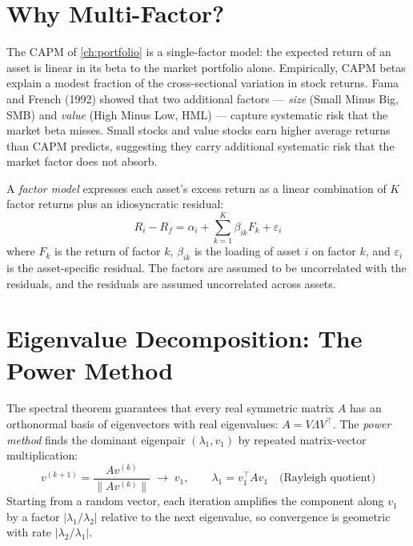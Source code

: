 \section{Why Multi-Factor?}


The CAPM of \cref{ch:portfolio} is a single-factor model: the expected
return of an asset is linear in its beta to the market portfolio alone.
Empirically, CAPM betas explain a modest fraction of the
cross-sectional variation in stock returns. Fama and French (1992)
showed that two additional factors --- \emph{size} (Small Minus Big,
SMB) and \emph{value} (High Minus Low, HML) --- capture systematic risk
that the market beta misses. Small stocks and value stocks earn higher
average returns than CAPM predicts, suggesting they carry additional
systematic risk that the market factor does not absorb.

\begin{marginfigure}
    \centering
    \vspace{-2cm}
    
    \caption{Scree plot: explained variance per principal component.
    The first PC captures 96\% of the total variance; the second adds
    3.9\%; the third adds only 0.3\%.}
    \label{fig:scree-plot}
\end{marginfigure}

A \emph{factor model} expresses each asset's excess return as a linear
combination of $K$ factor returns plus an idiosyncratic residual:
\[
  R_i - R_f = \alpha_i + \sum_{k=1}^{K} \beta_{ik} F_k + \varepsilon_i
\]
where $F_k$ is the return of factor $k$, $\beta_{ik}$ is the loading of
asset $i$ on factor $k$, and $\varepsilon_i$ is the asset-specific
residual. The factors are assumed to be uncorrelated with the
residuals, and the residuals are assumed uncorrelated across assets.

\section{Eigenvalue Decomposition: The Power Method}

The spectral theorem guarantees that every real symmetric matrix $A$
has an orthonormal basis of eigenvectors with real eigenvalues:
$A = V \Lambda V^\top$. The \emph{power method} finds the dominant
eigenpair $(\lambda_1, v_1)$ by repeated matrix-vector multiplication:
\[
  v^{(k+1)} = \frac{A v^{(k)}}{\|A v^{(k)}\|} \;\to\; v_1, \qquad
  \lambda_1 = v_1^\top A v_1 \quad \text{(Rayleigh quotient)}
\]
Starting from a random vector, each iteration amplifies the component
along $v_1$ by a factor $|\lambda_1 / \lambda_2|$ relative to the next
eigenvalue, so convergence is geometric with rate $|\lambda_2/\lambda_1|$.

